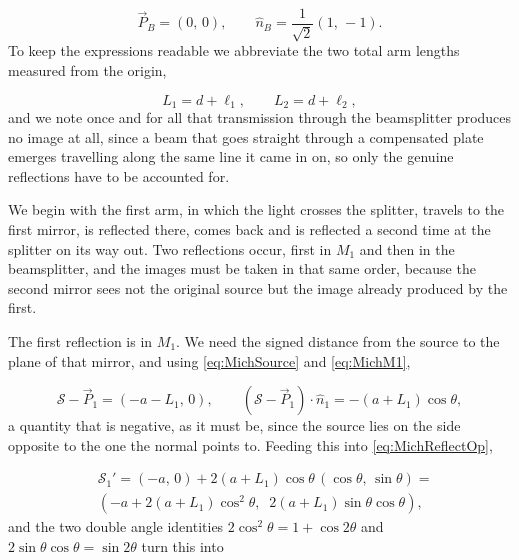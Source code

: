         \begin{equation}\label{eq:MichBS}
            \vec{P}_B = \left(0,\,0\right), \qquad \hat{n}_B = \frac{1}{\sqrt{2}}\left(1,\,-1\right).
        \end{equation}
        To keep the expressions readable we abbreviate the two total arm lengths measured from the origin,

        \begin{equation}\label{eq:MichLengths}
            L_1 = d+\ell_1, \qquad L_2 = d+\ell_2,
        \end{equation}
        and we note once and for all that transmission through the beamsplitter produces no image at all, since a beam that goes straight through a compensated plate emerges travelling along the same line it came in on, so only the genuine reflections have to be accounted for.

        We begin with the first arm, in which the light crosses the splitter, travels to the first mirror, is reflected there, comes back and is reflected a second time at the splitter on its way out. Two reflections occur, first in $M_1$ and then in the beamsplitter, and the images must be taken in that same order, because the second mirror sees not the original source but the image already produced by the first.

        The first reflection is in $M_1$. We need the signed distance from the source to the plane of that mirror, and using \ref{eq:MichSource} and \ref{eq:MichM1},

        \begin{equation*}
            \mathcal{S}-\vec{P}_1 = \left(-a-L_1,\,0\right), \qquad
            \left(\mathcal{S}-\vec{P}_1\right)\cdot\hat{n}_1 = -\left(a+L_1\right)\cos\theta ,
        \end{equation*}
        a quantity that is negative, as it must be, since the source lies on the side opposite to the one the normal points to. Feeding this into \ref{eq:MichReflectOp},

        \begin{align*}
            & \mathcal{S}_1' = \left(-a,\,0\right) + 2\left(a+L_1\right)\cos\theta\,\left(\cos\theta,\,\sin\theta\right) = \\
            & \left(-a + 2\left(a+L_1\right)\cos^{2}\theta,\;\; 2\left(a+L_1\right)\sin\theta\cos\theta\right),
        \end{align*}
        and the two double angle identities $2\cos^{2}\theta = 1+\cos 2\theta$ and $2\sin\theta\cos\theta = \sin 2\theta$ turn this into

